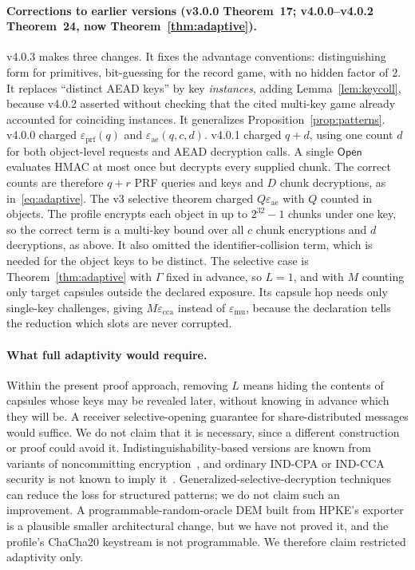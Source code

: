\documentclass[pdflatex,sn-mathphys-num,twocolumn]{sn-jnl}
\theoremstyle{plain}
\theoremstyle{definition}
\begin{document}
\paragraph{Corrections to earlier versions (v3.0.0 Theorem~17; v4.0.0--v4.0.2 Theorem~24, now Theorem~\ref{thm:adaptive}).}
v4.0.3 makes three changes. It fixes the advantage conventions: distinguishing form for primitives, bit-guessing for the record game, with no hidden factor of $2$. It replaces ``distinct AEAD keys'' by key \emph{instances}, adding Lemma~\ref{lem:keycoll}, because v4.0.2 asserted without checking that the cited multi-key game already accounted for coinciding instances. It generalizes Proposition~\ref{prop:patterns}. v4.0.0 charged $\varepsilon_{\mathrm{prf}}(q)$ and $\varepsilon_{\mathrm{ae}}(q,c,d)$. v4.0.1 charged $q+d$, using one count $d$ for both object-level requests and AEAD decryption calls. A single $\mathsf{Open}$ evaluates HMAC at most once but decrypts every supplied chunk. The correct counts are therefore $q+r$ PRF queries and keys and $D$ chunk decryptions, as in~\eqref{eq:adaptive}. The v3 selective theorem charged $Q\varepsilon_{\mathrm{ae}}$ with $Q$ counted in objects. The profile encrypts each object in up to $2^{32}-1$ chunks under one key, so the correct term is a multi-key bound over all $c$ chunk encryptions and $d$ decryptions, as above. It also omitted the identifier-collision term, which is needed for the object keys to be distinct. The selective case is Theorem~\ref{thm:adaptive} with $\Gamma$ fixed in advance, so $L=1$, and with $M$ counting only target capsules outside the declared exposure. Its capsule hop needs only single-key challenges, giving $M\varepsilon_{\mathrm{cca}}$ instead of $\varepsilon_{\mathrm{mu}}$, because the declaration tells the reduction which slots are never corrupted.

\paragraph{What full adaptivity would require.}
Within the present proof approach, removing $L$ means hiding the contents of capsules whose keys may be revealed later, without knowing in advance which they will be. A receiver selective-opening guarantee for share-distributed messages would suffice. We do not claim that it is necessary, since a different construction or proof could avoid it. Indistinguishability-based versions are known from variants of noncommitting encryption~\cite{hazay2015,canetti1996}, and ordinary IND-CPA or IND-CCA security is not known to imply it~\cite{bellare2009}. Generalized-selective-decryption techniques~\cite{panjwani2007,jafargholi2017} can reduce the loss for structured patterns; we do not claim such an improvement. A programmable-random-oracle DEM built from HPKE's exporter is a plausible smaller architectural change, but we have not proved it, and the profile's ChaCha20 keystream is not programmable. We therefore claim restricted adaptivity only.
\end{document}
